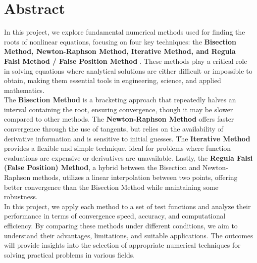 \documentclass[12pt,a4paper]{article}
\begin{document}
	\newpage
	
	\thispagestyle{empty}
	\section*{Abstract}
		
	
	\begin{normalsize}
	
	
	 In this project, we explore fundamental numerical methods used for finding the roots of nonlinear equations, focusing on four key techniques: the \textbf{Bisection Method, Newton-Raphson Method, Iterative Method, and Regula Falsi Method / False Position Method} . These methods play a critical role in solving equations where analytical solutions are either difficult or impossible to obtain, making them essential tools in engineering, science, and applied mathematics.\\
	
	The \textbf{Bisection Method} is a bracketing approach that repeatedly halves an interval containing the root, ensuring convergence, though it may be slower compared to other methods. The \textbf{Newton-Raphson Method} offers faster convergence through the use of tangents, but relies on the availability of derivative information and is sensitive to initial guesses. The \textbf{Iterative Method} provides a flexible and simple technique, ideal for problems where function evaluations are expensive or derivatives are unavailable. Lastly, the \textbf{Regula Falsi (False Position) Method}, a hybrid between the Bisection and Newton-Raphson methods, utilizes a linear interpolation between two points, offering better convergence than the Bisection Method while maintaining some robustness.\\
	
	 In this project, we apply each method to a set of test functions and analyze their performance in terms of convergence speed, accuracy, and computational efficiency. By comparing these methods under different conditions, we aim to understand their advantages, limitations, and suitable applications. The outcomes will provide insights into the selection of appropriate numerical techniques for solving practical problems in various fields.
	\end{normalsize}


	

	
		\newpage
	\tableofcontents
	\newpage
	\setcounter{page}{1}
	
\end{document}
